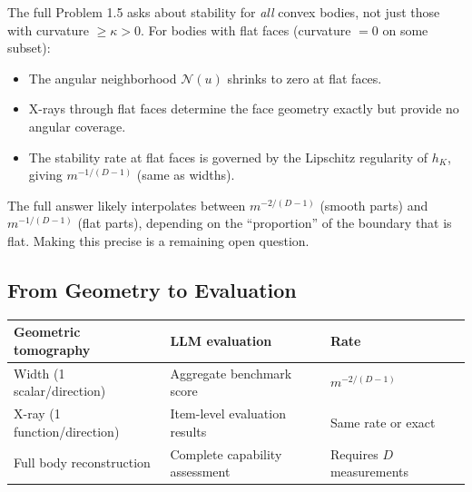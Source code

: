 \begin{remark}
The full Problem 1.5 asks about stability for \emph{all} convex bodies, not just those with curvature $\geq \kappa > 0$. For bodies with flat faces (curvature $= 0$ on some subset):
\begin{itemize}
  \item The angular neighborhood $\mathcal{N}(u)$ shrinks to zero at flat faces.
  \item X-rays through flat faces determine the face geometry exactly but provide no angular coverage.
  \item The stability rate at flat faces is governed by the Lipschitz regularity of $h_K$, giving $m^{-1/(D-1)}$ (same as widths).
\end{itemize}
The full answer likely interpolates between $m^{-2/(D-1)}$ (smooth parts) and $m^{-1/(D-1)}$ (flat parts), depending on the ``proportion'' of the boundary that is flat. Making this precise is a remaining open question.
\end{remark}


\subsection{From Geometry to Evaluation}

\begin{center}
\renewcommand{\arraystretch}{1.3}
\begin{tabular}{lll}
\toprule
\textbf{Geometric tomography} & \textbf{LLM evaluation} & \textbf{Rate} \\
\midrule
Width (1 scalar/direction) & Aggregate benchmark score & $m^{-2/(D-1)}$ \\
X-ray (1 function/direction) & Item-level evaluation results & Same rate or exact \\
Full body reconstruction & Complete capability assessment & Requires $D$ measurements \\
\bottomrule
\end{tabular}
\end{center}

